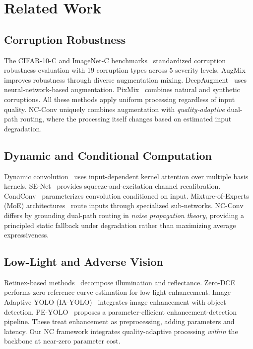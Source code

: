 \documentclass[journal]{IEEEtran}
\begin{document}
\section{Related Work}
\label{sec:related}

\subsection{Corruption Robustness}
The CIFAR-10-C and ImageNet-C benchmarks~\cite{hendrycks2019benchmarking} standardized corruption robustness evaluation with 19 corruption types across 5 severity levels.
AugMix~\cite{hendrycks2020augmix} improves robustness through diverse augmentation mixing.
DeepAugment~\cite{hendrycks2021deepaugment} uses neural-network-based augmentation.
PixMix~\cite{pixmix2022} combines natural and synthetic corruptions.
All these methods apply uniform processing regardless of input quality.
NC-Conv uniquely combines augmentation with \emph{quality-adaptive} dual-path routing, where the processing itself changes based on estimated input degradation.

\subsection{Dynamic and Conditional Computation}
Dynamic convolution~\cite{chen2020dynamic} uses input-dependent kernel attention over multiple basis kernels.
SE-Net~\cite{hu2018squeeze} provides squeeze-and-excitation channel recalibration.
CondConv~\cite{condconv2019} parameterizes convolution conditioned on input.
Mixture-of-Experts (MoE) architectures~\cite{shazeer2017outrageously} route inputs through specialized sub-networks.
NC-Conv differs by grounding dual-path routing in \emph{noise propagation theory}, providing a principled static fallback under degradation rather than maximizing average expressiveness.

\subsection{Low-Light and Adverse Vision}
Retinex-based methods~\cite{land1977retinex,wei2018deepretinex} decompose illumination and reflectance.
Zero-DCE~\cite{guo2020zerodce} performs zero-reference curve estimation for low-light enhancement.
Image-Adaptive YOLO (IA-YOLO)~\cite{iayolo2022} integrates image enhancement with object detection.
PE-YOLO~\cite{peyolo2023} proposes a parameter-efficient enhancement-detection pipeline.
These treat enhancement as preprocessing, adding parameters and latency.
Our NC framework integrates quality-adaptive processing \emph{within} the backbone at near-zero parameter cost.
\end{document}
